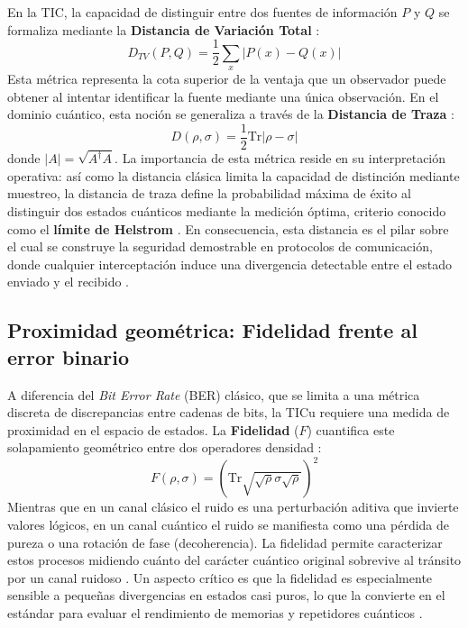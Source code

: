 \documentclass[11pt,a4paper,spanish]{book}
\begin{document}
En la TIC, la capacidad de distinguir entre dos fuentes de información $P$ y $Q$ se formaliza mediante la \textbf{Distancia de Variación Total} \citep{shannon1948}:
\begin{equation}
    D_{TV}(P, Q) = \frac{1}{2} \sum_x |P(x) - Q(x)|
\end{equation}
Esta métrica representa la cota superior de la ventaja que un observador puede obtener al intentar identificar la fuente mediante una única observación. En el dominio cuántico, esta noción se generaliza a través de la \textbf{Distancia de Traza} \citep{helstrom1969}:
\begin{equation}
    D(\rho, \sigma) = \frac{1}{2} \text{Tr} |\rho - \sigma|
\end{equation}
donde $|A| = \sqrt{A^\dagger A}$. La importancia de esta métrica reside en su interpretación operativa: así como la distancia clásica limita la capacidad de distinción mediante muestreo, la distancia de traza define la probabilidad máxima de éxito al distinguir dos estados cuánticos mediante la medición óptima, criterio conocido como el \textbf{límite de Helstrom} \citep{helstrom1969}. En consecuencia, esta distancia es el pilar sobre el cual se construye la seguridad demostrable en protocolos de comunicación, donde cualquier interceptación induce una divergencia detectable entre el estado enviado y el recibido \citep{bennett1993}.

\subsection{Proximidad geométrica: Fidelidad frente al error binario}

A diferencia del \textit{Bit Error Rate} (BER) clásico, que se limita a una métrica discreta de discrepancias entre cadenas de bits, la TICu requiere una medida de proximidad en el espacio de estados. La \textbf{Fidelidad} ($F$) cuantifica este solapamiento geométrico entre dos operadores densidad \citep{jozsa1994}:
\begin{equation}
    F(\rho, \sigma) = \left( \text{Tr} \sqrt{\sqrt{\rho} \sigma \sqrt{\rho}} \right)^2
\end{equation}
Mientras que en un canal clásico el ruido es una perturbación aditiva que invierte valores lógicos, en un canal cuántico el ruido se manifiesta como una pérdida de pureza o una rotación de fase (decoherencia). La fidelidad permite caracterizar estos procesos midiendo cuánto del carácter cuántico original sobrevive al tránsito por un canal ruidoso \citep{schumacher1995}. Un aspecto crítico es que la fidelidad es especialmente sensible a pequeñas divergencias en estados casi puros, lo que la convierte en el estándar para evaluar el rendimiento de memorias y repetidores cuánticos \citep{jozsa1994, nielsen2010}.
\end{document}
